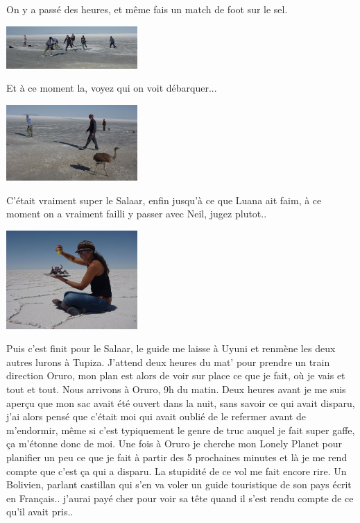 \begin{multicols}{2}
On y a passé des heures, et même fais un match de foot sur le sel.

\smallbreak
\hspace*{-0.65cm}
\includegraphics[width=5cm]{articles/La-paz-humahuaca-et-salaar/12573870691BvG.jpg}
\smallbreak

Et à ce moment la, voyez qui on voit débarquer...

\smallbreak
\hspace*{-0.65cm}
\includegraphics[width=5cm]{articles/La-paz-humahuaca-et-salaar/1257387056akBO.jpg}
\smallbreak

C'était vraiment super le Salaar, enfin jusqu'à ce que Luana ait faim, à ce moment on a vraiment failli y passer avec Neil, jugez plutot..

\smallbreak
\hspace*{-0.65cm}
\includegraphics[width=5cm]{articles/La-paz-humahuaca-et-salaar/12572036252qaK.jpg}
\smallbreak

Puis c'est finit pour le Salaar, le guide me laisse à Uyuni et renmène les deux autres lurons à Tupiza. J'attend deux heures du mat' pour prendre un train direction Oruro, mon plan est alors de voir sur place ce que je fait, où je vais et tout et tout. Nous arrivons à Oruro, 9h du matin. Deux heures avant je me suis aperçu que mon sac avait été ouvert dans la nuit, sans savoir ce qui avait disparu, j'ai alors pensé que c'était moi qui avait oublié de le refermer avant de m'endormir, même si c'est typiquement le genre de truc auquel je fait super gaffe, ça m'étonne donc de moi. Une fois à Oruro je cherche mon Lonely Planet pour planifier un peu ce que je fait à partir des 5 prochaines minutes et là je me rend compte que c'est ça qui a disparu. La stupidité de ce vol me fait encore rire. Un Bolivien, parlant castillan qui s'en va voler un guide touristique de son pays écrit en Français.. j'aurai payé cher pour voir sa tête quand il s'est rendu compte de ce qu'il avait pris..


\end{multicols}
